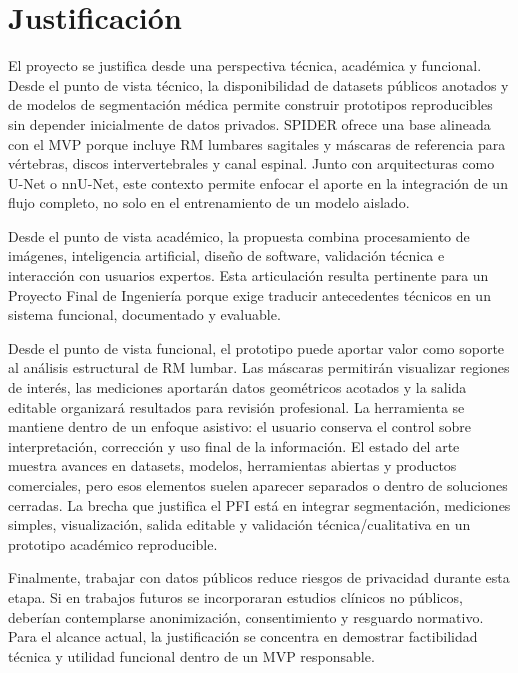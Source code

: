 \chapter{Justificaci\'on}

El proyecto se justifica desde una perspectiva t\'ecnica, acad\'emica y funcional. Desde el punto de vista t\'ecnico, la disponibilidad de datasets p\'ublicos anotados y de modelos de segmentaci\'on m\'edica permite construir prototipos reproducibles sin depender inicialmente de datos privados. SPIDER ofrece una base alineada con el MVP porque incluye RM lumbares sagitales y m\'ascaras de referencia para v\'ertebras, discos intervertebrales y canal espinal. Junto con arquitecturas como U-Net o nnU-Net, este contexto permite enfocar el aporte en la integraci\'on de un flujo completo, no solo en el entrenamiento de un modelo aislado.

Desde el punto de vista acad\'emico, la propuesta combina procesamiento de im\'agenes, inteligencia artificial, dise\~no de software, validaci\'on t\'ecnica e interacci\'on con usuarios expertos. Esta articulaci\'on resulta pertinente para un Proyecto Final de Ingenier\'ia porque exige traducir antecedentes t\'ecnicos en un sistema funcional, documentado y evaluable.

Desde el punto de vista funcional, el prototipo puede aportar valor como soporte al an\'alisis estructural de RM lumbar. Las m\'ascaras permitir\'an visualizar regiones de inter\'es, las mediciones aportar\'an datos geom\'etricos acotados y la salida editable organizar\'a resultados para revisi\'on profesional. La herramienta se mantiene dentro de un enfoque asistivo: el usuario conserva el control sobre interpretaci\'on, correcci\'on y uso final de la informaci\'on. El estado del arte muestra avances en datasets, modelos, herramientas abiertas y productos comerciales, pero esos elementos suelen aparecer separados o dentro de soluciones cerradas. La brecha que justifica el PFI est\'a en integrar segmentaci\'on, mediciones simples, visualizaci\'on, salida editable y validaci\'on t\'ecnica/cualitativa en un prototipo acad\'emico reproducible.

Finalmente, trabajar con datos p\'ublicos reduce riesgos de privacidad durante esta etapa. Si en trabajos futuros se incorporaran estudios cl\'inicos no p\'ublicos, deber\'ian contemplarse anonimizaci\'on, consentimiento y resguardo normativo. Para el alcance actual, la justificaci\'on se concentra en demostrar factibilidad t\'ecnica y utilidad funcional dentro de un MVP responsable.
